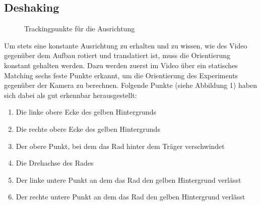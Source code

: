 \documentclass[a4paper,german,12pt,smallheadings]{scrartcl}
\begin{document}
\subsection{Deshaking}
\begin{figure}
  \caption{Trackingpunkte für die Ausrichtung}
\end{figure}
Um stets eine konstante Ausrichtung zu erhalten und zu wissen, wie des Video
gegenüber dem Aufbau rotiert und translatiert ist, muss die Orientierung
konstant gehalten werden.  Dazu werden zuerst im Video über ein statisches
Matching sechs feste Punkte erkannt, um die Orientierung des Experiments
gegenüber der Kamera zu berechnen. Folgende Punkte (siehe Abbildung 1) haben
sich dabei als gut erkennbar herausgestellt:
\begin{enumerate}
  \item Die linke obere Ecke des gelben Hintergrunds
  \item Die rechte obere Ecke des gelben Hintergrunds
  \item Der obere Punkt, bei dem das Rad hinter dem Träger verschwindet
  \item Die Drehachse des Rades
  \item Der linke untere Punkt an dem das Rad den gelben Hintergrund verlässt
  \item Der rechte untere Punkt an dem das Rad den gelben Hintergrund verlässt
\end{enumerate}
\end{document}
